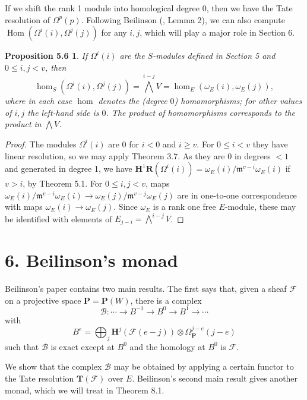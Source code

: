 \documentclass{tran-l}
\newcommand{\myHom}{\operatorname{Hom}}
\newcommand{\myB}{\mathcal{B}}
\newcommand{\F}{\mathcal{F}}
\newcommand{\myH}{\mathbf{H}}
\newcommand{\myP}{\mathbf{P}}
\newcommand{\RR}{\mathbf{R}}
\newcommand{\TT}{\mathbf{T}}
\newcommand{\gm}{{\mathfrak{m}}}
\theoremstyle{plain}
\newtheorem*{theorem24}{Proposition 5.6}
\theoremstyle{remark}
\theoremstyle{definition}
\begin{document}
If we shift the rank 1 module into homological degree $0$, then we have the Tate resolution of
 $\Omega ^{p}(p)$. Following Beilinson (\cite{Bei}, Lemma 2), we can also compute
$\myHom (\Omega ^{i}(i),\Omega ^{j}(j))$ for any $i,j$, which will play a
major role in Section 6.


\begin{theorem24}
If $\Omega ^{i}(i)$ are the $S$-modules defined in
Section 5 and $0\leq i,j < v$, then
\begin{equation*}\hom _{S}(\Omega ^{i}(i), \Omega ^{j}(j))=
\textstyle{\bigwedge ^{i-j}}V = \hom _{E}(\omega _{E}(i),\omega _{E}(j)),
\end{equation*}
where in each case $\hom $ denotes the (degree $0$) homomorphisms;
for other values of $i,j$ the left-hand side is $0$.
The product of
homomorphisms corresponds to the product in $\bigwedge V$.
\end{theorem24}
\begin{proof}  The modules $\Omega ^{i}(i)$ are 0 for $i<0$ and $i\geq v$.
For $0\leq i<v$  they
have linear resolution, so we may apply Theorem 3.7.
As they are 0 in degrees $<1$ and generated in degree 1,
we have
$\myH ^{1}\RR (\Omega ^{i}(i))=\omega _{E}(i)/\gm ^{v-i}\omega _{E}(i)$ if
$v>i$,
by Theorem 5.1. For $0\leq i,j <v$,  maps
$\omega _{E}(i)/\gm ^{v-i}\omega _{E}(i)\to \omega _{E}(j)/\gm ^{v-j}\omega _{E}(j)$
are in one-to-one correspondence with maps $\omega _{E}(i)\to \omega _{E}(j)$. Since $\omega _{E}$ is
a rank one free $E$-module, these may be identified with elements of
$E_{j-i}=\bigwedge ^{i-j}V$. \end{proof}


\section*{6. Beilinson's monad}

Beilinson's paper \cite{Bei} contains
two main results. The first says that, given
a sheaf $\F $ on a projective space $\myP =\myP (W)$, there is a complex
\begin{equation*}\myB : \cdots \to B^{-1}\to B^{0} \to B^{1}\to \cdots \end{equation*}
with
\begin{equation*}B^{e}=\bigoplus _{j}\myH ^{j}(\F (e-j))\otimes 
\Omega _{\myP }^{j-e}(j-e)
\end{equation*}
such that $\myB $ is exact except at $B^{0}$ and
the homology at $B^{0}$ is $\F $.

We show that
the complex $\myB $ may be obtained by applying a certain functor to the
Tate resolution
$\TT (\F )$ over $E$. Beilinson's second main result gives another monad,
which we will treat in Theorem 8.1.
\end{document}
